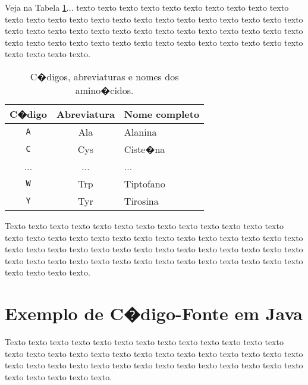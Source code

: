 Veja na Tabela \ref{tab:amino_acidos}...  texto texto texto texto texto texto
texto texto texto texto texto texto texto texto texto texto texto texto texto
texto texto texto texto texto texto texto texto texto texto texto texto texto
texto texto texto texto texto texto texto texto texto texto texto texto texto
texto texto texto texto texto texto texto texto texto texto texto.

\begin{table}[!t]
\begin{center}
    \begin{tabular}{c|c|l}
	 \hline
	 C�digo & Abreviatura & Nome completo \\ \hline
     \texttt{A} & Ala & Alanina \\
     \texttt{C} & Cys & Ciste�na \\
     ...        & ... & ... \\
     \texttt{W} & Trp & Tiptofano \\
     \texttt{Y} & Tyr & Tirosina \\ \hline
    \end{tabular}
  \caption{C�digos, abreviaturas e nomes dos amino�cidos.}
  \label{tab:amino_acidos}
\end{center}
\end{table}

Texto texto texto texto texto texto texto texto texto texto texto texto texto
texto texto texto texto texto texto texto texto texto texto texto texto texto
texto texto texto texto texto texto texto texto texto texto texto texto texto
texto texto texto texto texto texto texto texto texto texto texto texto texto
texto texto texto texto texto texto texto.


\section{Exemplo de C�digo-Fonte em Java}
\label{sec:exemplo_codigo_fonte}
Texto texto texto texto texto texto texto texto texto texto texto texto texto
texto texto texto texto texto texto texto texto texto texto texto texto texto
texto texto texto texto texto texto texto texto texto texto texto texto texto
texto texto texto texto texto texto texto.


